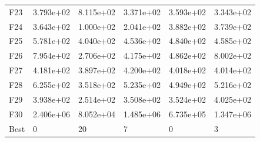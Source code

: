 \begin{tabular}{llllll}
F23  &  3.793e+02 &  8.115e+02 &  3.371e+02 &  3.593e+02 &  3.343e+02 \\
F24  &  3.643e+02 &  1.000e+02 &  2.041e+02 &  3.882e+02 &  3.739e+02 \\
F25  &  5.781e+02 &  4.040e+02 &  4.536e+02 &  4.840e+02 &  4.585e+02 \\
F26  &  7.954e+02 &  2.706e+02 &  4.175e+02 &  4.862e+02 &  8.002e+02 \\
F27  &  4.181e+02 &  3.897e+02 &  4.200e+02 &  4.018e+02 &  4.014e+02 \\
F28  &  6.255e+02 &  3.518e+02 &  5.235e+02 &  4.949e+02 &  5.216e+02 \\
F29  &  3.938e+02 &  2.514e+02 &  3.508e+02 &  3.524e+02 &  4.025e+02 \\
F30  &  2.406e+06 &  8.052e+04 &  1.485e+06 &  6.735e+05 &  1.347e+06 \\
Best &          0 &         20 &          7 &          0 &          3 \\
\bottomrule
\end{tabular}
